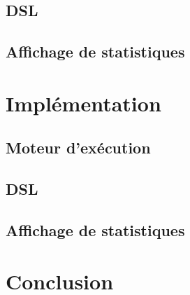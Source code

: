 \documentclass[12pt]{report}
\begin{document}
  \section{DSL}
  \section{Affichage de statistiques}
  
  \chapter{Implémentation}
  \section{Moteur d'exécution}
  \section{DSL}
  \section{Affichage de statistiques}
  
  \chapter{Conclusion}
  
\end{document}
